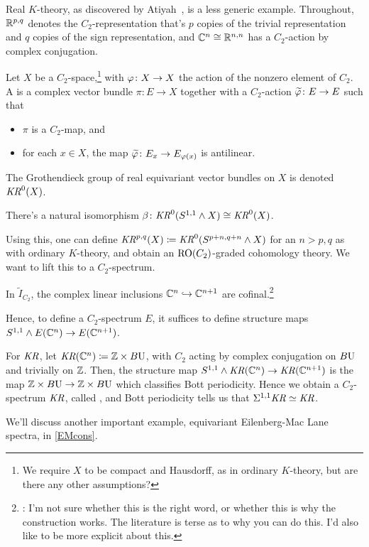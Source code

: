 \begin{exm}
Real $K$-theory, as discovered by Atiyah~\cite{AtiyahKR}, is a less generic example. Throughout, $\mathbb R^{p,q}$ denotes
the $C_2$-representation that's $p$ copies of the trivial representation and $q$ copies of the sign representation,
and $\mathbb C^n\cong\mathbb R^{n,n}$ has a $C_2$-action by complex conjugation.
\begin{defn}
Let $X$ be a $C_2$-space,\footnote{We require $X$ to be compact and Hausdorff, as in ordinary $K$-theory, but are
there any other assumptions?} with $\varphi\colon X\to X$ the action of the nonzero element of $C_2$. A  is a complex vector bundle $\pi\colon E\to X$ together with a $C_2$-action
$\widetilde{\varphi}\colon E\to E$ such that
\begin{itemize}
	\item $\pi$ is a $C_2$-map, and
	\item for each $x\in X$, the map $\widetilde{\varphi}\colon E_x\to E_{\varphi(x)}$ is antilinear.
\end{itemize}
\end{defn}
The Grothendieck group of real equivariant vector bundles on $X$ is denoted $\mathit{KR}^0(X)$.
\begin{thm}
There's a natural isomorphism $\beta\colon\mathit{KR}^0(S^{1,1}\wedge X)\cong \mathit{KR}^0(X)$.
\end{thm}
Using this, one can define $\mathit{KR}^{p,q}(X) \coloneqq \mathit{KR}^0(S^{p+n, q+n}\wedge X)$ for an $n > p,q$ as with ordinary
$K$-theory, and obtain an $\mathrm{RO}(C_2)$-graded cohomology theory. We want to lift this to a $C_2$-spectrum.
\begin{lem}
In $\widetilde I_{C_2}$, the complex linear inclusions $\mathbb C^n\hookrightarrow\mathbb C^{n+1}$ are cofinal.\footnote{\TODO: I'm not sure
whether this is the right word, or whether this is why the construction works. The literature is terse as to why
you can do this. I'd also like to be more explicit about this.}
\end{lem}
Hence, to define a $C_2$-spectrum $E$, it suffices to define structure maps $S^{1,1}\wedge E(\mathbb C^n)\to E(\mathbb C^{n+1})$.

For $\mathit{KR}$, let $\mathit{KR}(\mathbb C^n) \coloneqq \mathbb Z\times B\mathrm U$, with $C_2$ acting by complex conjugation on $B\mathrm U$ and trivially
on $\mathbb Z$. Then, the structure map $S^{1,1}\wedge \mathit{KR}(\mathbb C^n)\to\mathit{KR}(\mathbb C^{n+1})$ is the map $\mathbb Z\times B\mathrm U\to\mathbb Z\times B\mathrm U$
which classifies Bott periodicity. Hence we obtain a $C_2$-spectrum $\mathit{KR}$, called , and Bott periodicity tells us that $\Sigma^{1,1}\mathit{KR}\simeq\mathit{KR}$.
\end{exm}
We'll discuss another important example, equivariant Eilenberg-Mac Lane spectra, in \cref{EMcons}.

